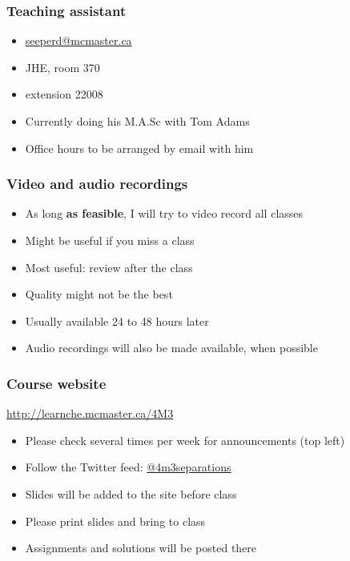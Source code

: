 \begin{frame}\frametitle{Teaching assistant}
	{\color{myGreen}{Dominik Seepersad}}
	\begin{itemize}
		\item	\url{seeperd@mcmaster.ca}
		\item	JHE, room 370
		\item	extension 22008
		\item	Currently doing his M.A.Sc with Tom Adams
		\item	Office hours to be arranged by email with him
	\end{itemize}
\end{frame}

\begin{frame}\frametitle{Video and audio recordings}
	\begin{itemize}
		\item	As long \textbf{as feasible}, I will try to video record all classes
		\item	Might be useful if you miss a class
		\item	Most useful: review after the class
		\item	Quality might not be the best   
		\item	Usually available 24 to 48 hours later
		\item	Audio recordings will also be made available, when possible
	\end{itemize}
\end{frame}

\begin{frame}\frametitle{Course website}
	
	\begin{exampleblock}{}
		\centering 
		\href{http://learnche.mcmaster.ca/4M3}{http://learnche.mcmaster.ca/4M3}
	\end{exampleblock}
	\begin{itemize}
		\item	Please check several times per week for announcements {\tiny (top left)}
		\item	Follow the Twitter feed: \href{https://twitter.com/4m3separations}{@4m3separations}
		\item	Slides will be added to the site before class
		\item	Please print slides and bring to class
		\item	Assignments and solutions will be posted there
	\end{itemize}
\end{frame}

